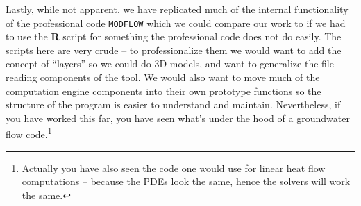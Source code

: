Lastly, while not apparent, we have replicated much of the internal functionality of the professional code \texttt{MODFLOW} which we could compare our work to if we had to use the \textbf{R} script for something the professional code does not do easily. 
The scripts here are very crude -- to professionalize them we would want to add the concept of ``layers'' so we could do 3D models, and want to generalize the file reading components of the tool.  
We would also want to move much of the computation engine components into their own prototype functions so the structure of the program is easier to understand and maintain.
Nevertheless, if you have worked this far, you have seen what's under the hood of a groundwater flow code.\footnote{Actually you have also seen the code one would use for linear heat flow computations -- because the PDEs look the same, hence the solvers will work the same.}


